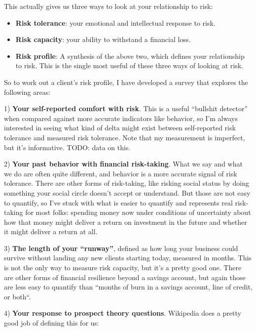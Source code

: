 This actually gives us three ways to look at your relationship to risk:

\begin{itemize}
\item \textbf{Risk tolerance}: your emotional and intellectual response to risk.
\item \textbf{Risk capacity}: your ability to withstand a financial loss.
\item \textbf{Risk profile}: A synthesis of the above two, which defines your relationship to risk. This is the single most useful of these three ways of looking at risk.
\end{itemize}

So to work out a client's risk profile, I have developed a survey that explores the following areas:

1) \textbf{Your self-reported comfort with risk}. This is a useful ``bullshit detector'' when compared against more accurate indicators like behavior, so I'm always interested in seeing what kind of delta might exist between self-reported risk tolerance and measured risk tolerance. Note that my measurement is imperfect, but it's informative. TODO: data on this.

2) \textbf{Your past behavior with financial risk-taking}. What we say and what we do are often quite different, and behavior is a more accurate signal of risk tolerance. There are other forms of risk-taking, like risking social status by doing something your social circle doesn't accept or understand. But those are not easy to quantify, so I've stuck with what is easier to quantify and represents real risk-taking for most folks: spending money now under conditions of uncertainty about how that money might deliver a return on investment in the future and whether it might deliver a return at all.

3) \textbf{The length of your ``runway''}, defined as how long your business could survive without landing any new clients starting today, measured in months. This is not the only way to measure risk capacity, but it's a pretty good one. There are other forms of financial resilience beyond a savings account, but again those are less easy to quantify than ``months of burn in a savings account, line of credit, or both“.

4) \textbf{Your response to prospect theory questions}. Wikipedia does a pretty good job of defining this for us:

